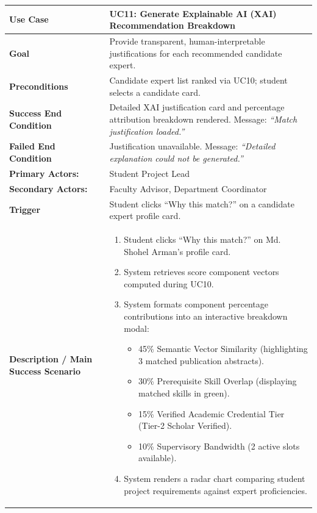 \begin{table}[H]
\centering
\small
\begin{tabularx}{\textwidth}{|l|X|}
\hline
\rowcolor{lightgray!40} \textbf{Use Case} & \textbf{UC11: Generate Explainable AI (XAI) Recommendation Breakdown} \\ \hline
\textbf{Goal} & Provide transparent, human-interpretable justifications for each recommended candidate expert. \\ \hline
\textbf{Preconditions} & Candidate expert list ranked via UC10; student selects a candidate card. \\ \hline
\textbf{Success End Condition} & Detailed XAI justification card and percentage attribution breakdown rendered. Message: \textit{``Match justification loaded.''} \\ \hline
\textbf{Failed End Condition} & Justification unavailable. Message: \textit{``Detailed explanation could not be generated.''} \\ \hline
\textbf{Primary Actors:} & Student Project Lead \\
\textbf{Secondary Actors:} & Faculty Advisor, Department Coordinator \\ \hline
\textbf{Trigger} & Student clicks ``Why this match?'' on a candidate expert profile card. \\ \hline
\textbf{Description / Main Success Scenario} &
\begin{enumerate}[leftmargin=*]
    \item Student clicks ``Why this match?'' on Md. Shohel Arman's profile card.
    \item System retrieves score component vectors computed during UC10.
    \item System formats component percentage contributions into an interactive breakdown modal:
    \begin{itemize}[leftmargin=*]
        \item 45\% Semantic Vector Similarity (highlighting 3 matched publication abstracts).
        \item 30\% Prerequisite Skill Overlap (displaying matched skills in green).
        \item 15\% Verified Academic Credential Tier (Tier-2 Scholar Verified).
        \item 10\% Supervisory Bandwidth (2 active slots available).
    \end{itemize}
    \item System renders a radar chart comparing student project requirements against expert proficiencies.

\end{enumerate}
\end{tabularx}
\end{table}
